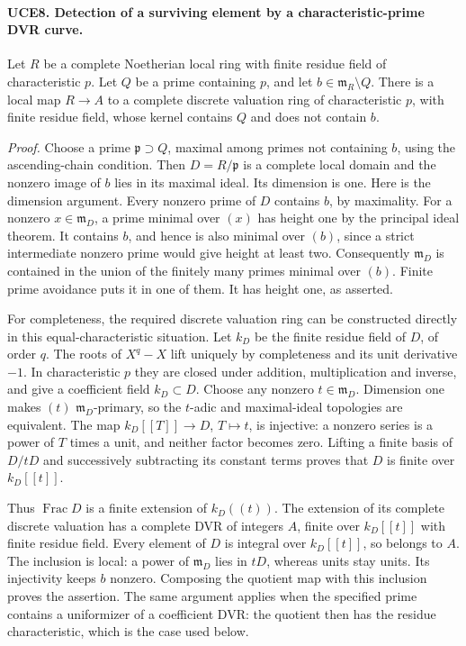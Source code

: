 \documentclass[11pt,a4paper]{article}
\numberwithin{equation}{section}
\theoremstyle{remark}\newtheorem{remark}[theorem]{Remark}
\begin{document}
\paragraph{UCE8. Detection of a surviving element by a characteristic-prime DVR curve.}
\label{claim:UCE8}
Let \(R\) be a complete Noetherian local ring with finite residue
field of characteristic \(p\).  Let \(Q\) be a prime containing
\(p\), and let \(b\in\mathfrak m_R\setminus Q\).  There is
a local map \(R\to A\) to a complete discrete valuation ring of
characteristic \(p\), with finite residue field, whose kernel
contains \(Q\) and does not contain \(b\).

\emph{Proof.}
Choose a prime \(\mathfrak p\supset Q\), maximal among primes
not containing \(b\), using the ascending-chain condition.
Then \(D=R/\mathfrak p\) is a complete local domain and the
nonzero image of \(b\) lies in its maximal ideal.  Its dimension
is one.  Here is the dimension argument.  Every nonzero prime of
\(D\) contains \(b\), by maximality.  For a nonzero
\(x\in\mathfrak m_D\), a prime minimal over \((x)\) has
height one by the principal ideal theorem.  It contains \(b\),
and hence is also minimal over \((b)\), since a strict intermediate
nonzero prime would give height at least two.  Consequently
\(\mathfrak m_D\) is contained in the union of the finitely many
primes minimal over \((b)\).  Finite prime avoidance puts it in
one of them.  It has height one, as asserted.

For completeness, the required discrete valuation ring can be
constructed directly in this equal-characteristic situation.
Let \(k_D\) be the finite residue field of \(D\), of order \(q\).
The roots of \(X^q-X\) lift uniquely by completeness and its unit
derivative \(-1\).  In characteristic \(p\) they are closed
under addition, multiplication and inverse, and give a coefficient
field \(k_D\subset D\).  Choose any nonzero
\(t\in\mathfrak m_D\).  Dimension one makes \((t)\)
\(\mathfrak m_D\)-primary, so the \(t\)-adic and maximal-ideal
topologies are equivalent.  The map \(k_D[[T]]\to D\),
\(T\mapsto t\), is injective: a nonzero series is a power of
\(T\) times a unit, and neither factor becomes zero.  Lifting a
finite basis of \(D/tD\) and successively subtracting its constant
terms proves that \(D\) is finite over \(k_D[[t]]\).

Thus \(\operatorname{Frac}D\) is a finite extension of
\(k_D((t))\).  The extension of its complete discrete valuation
has a complete DVR of integers \(A\), finite over \(k_D[[t]]\)
with finite residue field.  Every element of \(D\) is integral
over \(k_D[[t]]\), so belongs to \(A\).  The inclusion is local:
a power of \(\mathfrak m_D\) lies in \(tD\), whereas units
stay units.  Its injectivity keeps \(b\) nonzero.  Composing the
quotient map with this inclusion proves the assertion.  The same
argument applies when the specified prime contains a uniformizer
of a coefficient DVR: the quotient then has the residue
characteristic, which is the case used below.
\end{document}
